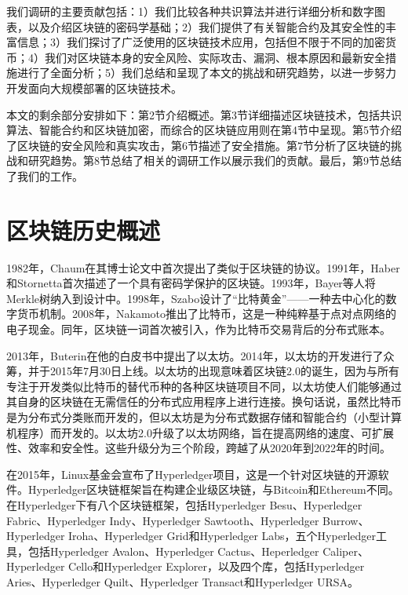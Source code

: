 \begin{translation}
我们调研的主要贡献包括：1）我们比较各种共识算法并进行详细分析和数字图表，以及介绍区块链的密码学基础；2）我们提供了有关智能合约及其安全性的丰富信息；3）我们探讨了广泛使用的区块链技术应用，包括但不限于不同的加密货币；4）我们对区块链本身的安全风险、实际攻击、漏洞、根本原因和最新安全措施进行了全面分析；5）我们总结和呈现了本文的挑战和研究趋势，以进一步努力开发面向大规模部署的区块链技术。

本文的剩余部分安排如下：第2节介绍概述。第3节详细描述区块链技术，包括共识算法、智能合约和区块链加密，而综合的区块链应用则在第4节中呈现。第5节介绍了区块链的安全风险和真实攻击，第6节描述了安全措施。第7节分析了区块链的挑战和研究趋势。第8节总结了相关的调研工作以展示我们的贡献。最后，第9节总结了我们的工作。

\section{区块链历史概述}

1982年，Chaum在其博士论文中首次提出了类似于区块链的协议\cite{art4}。1991年，Haber和Stornetta首次描述了一个具有密码学保护的区块链\cite{art5}。1993年，Bayer等人将Merkle树纳入到设计中\cite{art6}。1998年，Szabo设计了“比特黄金”——一种去中心化的数字货币机制\cite{art7}。2008年，Nakamoto推出了比特币，这是一种纯粹基于点对点网络的电子现金\cite{art8}。同年，区块链一词首次被引入，作为比特币交易背后的分布式账本\cite{art9}。

2013年，Buterin在他的白皮书中提出了以太坊\cite{art10}。2014年，以太坊的开发进行了众筹，并于2015年7月30日上线。以太坊的出现意味着区块链2.0的诞生，因为与所有专注于开发类似比特币的替代币种的各种区块链项目不同，以太坊使人们能够通过其自身的区块链在无需信任的分布式应用程序上进行连接。换句话说，虽然比特币是为分布式分类账而开发的，但以太坊是为分布式数据存储和智能合约（小型计算机程序）而开发的。以太坊2.0升级了以太坊网络，旨在提高网络的速度、可扩展性、效率和安全性。这些升级分为三个阶段，跨越了从2020年到2022年的时间。

在2015年，Linux基金会宣布了Hyperledger项目，这是一个针对区块链的开源软件。Hyperledger区块链框架旨在构建企业级区块链，与Bitcoin和Ethereum不同。在Hyperledger下有八个区块链框架，包括Hyperledger Besu、Hyperledger Fabric、Hyperledger Indy、Hyperledger Sawtooth、Hyperledger Burrow、Hyperledger Iroha、Hyperledger Grid和Hyperledger Labs，五个Hyperledger工具，包括Hyperledger Avalon、Hyperledger Cactus、Heperledger Caliper、Hyperledger Cello和Hyperledger Explorer，以及四个库，包括Hyperledger Aries、Hyperledger Quilt、Hyperledger Transact和Hyperledger URSA\cite{art11}。


\end{translation}
